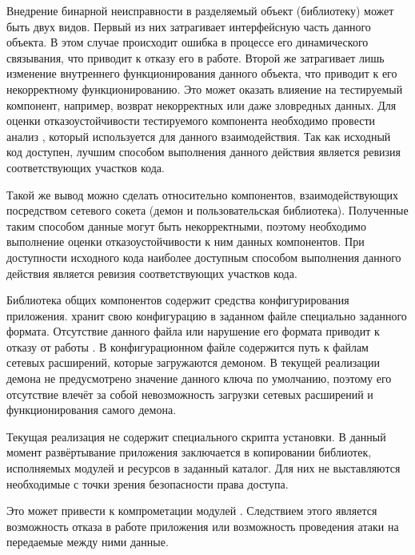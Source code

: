%
Внедрение бинарной неисправности в разделяемый объект (библиотеку) может быть двух видов. 
%
Первый из них затрагивает интерфейсную часть данного объекта. 
%
В этом случае происходит ошибка в процессе его динамического связывания, что приводит к отказу его в работе. 
%
Второй же затрагивает лишь изменение внутреннего функционирования данного объекта, что приводит к его некорректному функционированию. 
%
Это может оказать влияение на тестируемый компонент, например, возврат некорректных или даже зловредных данных. 
%
Для оценки отказоустойчивости тестируемого компонента необходимо провести анализ , который используется для данного взаимодействия. 
%
Так как исходный код  доступен, лучшим способом выполнения данного действия является ревизия соответствующих участков кода. 

%
Такой же вывод можно сделать относительно компонентов, взаимодействующих посредством сетевого сокета (демон и пользовательская библиотека). 
%
Полученные таким способом данные могут быть некорректными, поэтому необходимо выполнение оценки отказоустойчивости к ним данных компонентов. 
%
При доступности исходного кода  наиболее доступным способом выполнения данного действия является ревизия соответствующих участков кода. 

%
Библиотека общих компонентов содержит средства конфигурирования приложения. 
%
 хранит свою конфигурацию в заданном файле специально заданного формата. 
%
Отсутствие данного файла или нарушение его формата приводит к отказу от работы . 
%
В конфигурационном файле содержится путь к файлам сетевых расширений, которые загружаются демоном. 
%
В текущей реализации демона не предусмотрено значение данного ключа по умолчанию, поэтому его отсутствие влечёт за собой невозможность загрузки сетевых расширений и функционирования самого демона. 

%
Текущая реализация  не содержит специального скрипта установки. 
%
В данный момент развёртывание приложения заключается в копировании библиотек, исполняемых модулей и ресурсов в заданный каталог. 
%
Для них не выставляются необходимые с точки зрения безопасности права доступа. 

%
Это может привести к компрометации модулей . 
%
Следствием этого является возможность отказа в работе приложения или возможность проведения атаки на передаемые между ними данные. 

